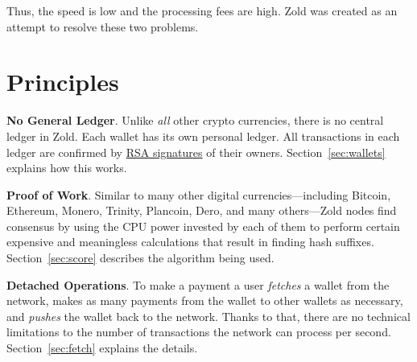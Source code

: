 \documentclass{main}
\begin{document}
Thus, the speed is low and the processing fees are high.
Zold was created as an attempt to resolve these two problems.

\section{Principles}

\textbf{No General Ledger}.
Unlike \emph{all} other crypto currencies, there is no central ledger in Zold.
Each wallet has its own personal ledger.
All transactions in each ledger are confirmed by
\href{https://en.wikipedia.org/wiki/RSA_(cryptosystem)}{RSA signatures} of their owners.
Section~\ref{sec:wallets} explains how this works.

\textbf{Proof of Work}.
Similar to many other digital currencies---including Bitcoin, Ethereum, Monero, Trinity, Plancoin, Dero,
and many others---Zold nodes find consensus by using the CPU power invested
by each of them to perform certain expensive and meaningless calculations that result in finding hash suffixes.
Section~\ref{sec:score} describes the algorithm being used.

\textbf{Detached Operations}.
To make a payment a user \emph{fetches} a wallet from the network,
makes as many payments from the wallet to other wallets as necessary,
and \emph{pushes} the wallet back to the network.
Thanks to that, there are no technical limitations to
the number of transactions the network can process per second.
Section~\ref{sec:fetch} explains the details.
\end{document}
